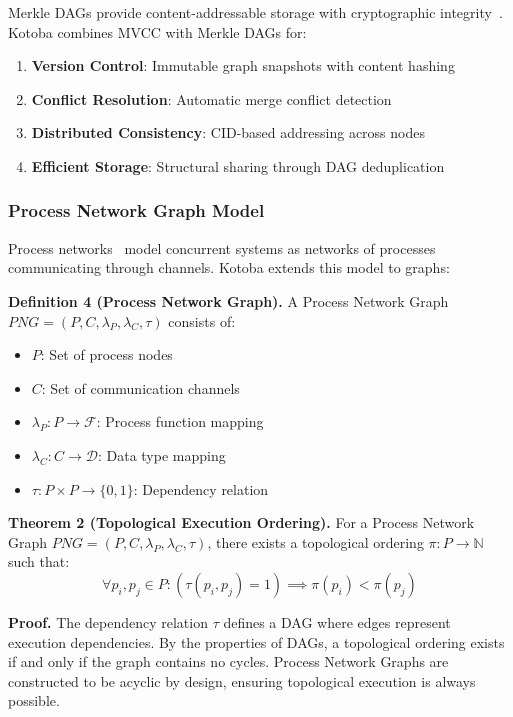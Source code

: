 \documentclass[11pt,a4paper]{article}
\begin{document}
Merkle DAGs provide content-addressable storage with cryptographic integrity~\cite{merkle_dag}. Kotoba combines MVCC with Merkle DAGs for:

\begin{enumerate}
\item \textbf{Version Control}: Immutable graph snapshots with content hashing
\item \textbf{Conflict Resolution}: Automatic merge conflict detection
\item \textbf{Distributed Consistency}: CID-based addressing across nodes
\item \textbf{Efficient Storage}: Structural sharing through DAG deduplication
\end{enumerate}

\subsubsection{Process Network Graph Model}
\label{subsubsec:process_network}

Process networks~\cite{kahn1974} model concurrent systems as networks of processes communicating through channels. Kotoba extends this model to graphs:

\textbf{Definition 4 (Process Network Graph).} A Process Network Graph $PNG = (P, C, \lambda_P, \lambda_C, \tau)$ consists of:
\begin{itemize}
\item $P$: Set of process nodes
\item $C$: Set of communication channels
\item $\lambda_P: P \rightarrow \mathcal{F}$: Process function mapping
\item $\lambda_C: C \rightarrow \mathcal{D}$: Data type mapping
\item $\tau: P \times P \rightarrow \{0,1\}$: Dependency relation
\end{itemize}

\textbf{Theorem 2 (Topological Execution Ordering).} For a Process Network Graph $PNG = (P, C, \lambda_P, \lambda_C, \tau)$, there exists a topological ordering $\pi: P \rightarrow \mathbb{N}$ such that:
\[
\forall p_i, p_j \in P: (\tau(p_i, p_j) = 1) \implies \pi(p_i) < \pi(p_j)
\]

\textbf{Proof.} The dependency relation $\tau$ defines a DAG where edges represent execution dependencies. By the properties of DAGs, a topological ordering exists if and only if the graph contains no cycles. Process Network Graphs are constructed to be acyclic by design, ensuring topological execution is always possible.
\end{document}
